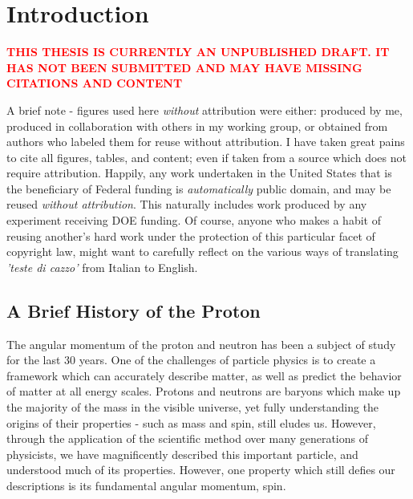 \chapter{Introduction}

\textbf{\textcolor{red}{THIS THESIS IS CURRENTLY AN UNPUBLISHED DRAFT. IT HAS
NOT BEEN SUBMITTED AND MAY HAVE MISSING CITATIONS AND CONTENT}}

A brief note - figures used here \textit{without} attribution were either:
produced by me, produced in collaboration with others in my working group, or
obtained from authors who labeled them for reuse without attribution. I have taken
great pains to cite all figures, tables, and content; even if taken from a
source which does not require attribution. Happily, any work undertaken in the
United States that is the beneficiary of Federal funding is
\textit{automatically} public domain, and may be reused \textit{without
attribution}. This naturally includes work produced by any experiment receiving
DOE funding. Of course, anyone who makes a habit of reusing another's hard work
under the protection of this particular facet of copyright law, might want to
carefully reflect on the various ways of translating \textit{'teste di cazzo'}
from Italian to English.

\section{A Brief History of the Proton}
The angular momentum of the proton and neutron has been a subject of study for
the last 30 years. One of the challenges of particle physics is to
create a framework which can accurately describe matter, as well as predict the
behavior of matter at all energy scales. Protons and neutrons are baryons which
make up the majority of the mass in the visible universe, yet fully
understanding the origins of their properties - such as  mass and spin, still
eludes us. However, through the application of the scientific method over many
generations of physicists, we have magnificently described this important
particle, and understood much of its properties. However, one property which
still defies our descriptions is its fundamental angular momentum, spin. \\
	

